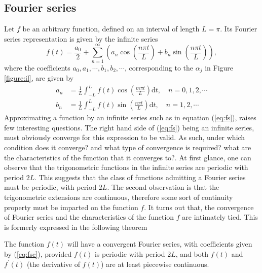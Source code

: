 \documentclass[../Main/thesis.tex]{subfiles}
\begin{document}
\justify
\subsection{Fourier series}
\label{sec:fouurier-serie}
 Let $f$ be an arbitrary function, defined on an interval of length $L = \pi$. Its Fourier series representation is given by the infinite series
\begin{equation}\label{eq:fs}
f(t) = \frac{a_{0}}{2} +\sum_{n=1}^{\infty}\left( a_{n} \cos\left( \frac{n\pi t}{L}\right) + b_{n} \sin\left( \frac{n\pi t}{L}\right)  \right),
 \end{equation}
where the coefficients $a_{0}, a_{1}, \cdots, b_{1}, b_{2},\cdots$, corresponding to the $\alpha_{j}$ in Figure \ref{figure:il}, are given by 
\begin{equation}\label{eq:fsc}
\begin{split}
a_{n} &= \frac{1}{L}\int_{-L}^{L}f(t)\cos\left( \frac{m\pi t}{L}\right) \mathrm{d}t,\quad n=0,1,2,\cdots\\
b_{n} &= \frac{1}{L}\int_{-L}^{L}f(t)\sin\left( \frac{n\pi t}{L}\right) \mathrm{d}t,\quad n=1,2,\cdots
\end{split}
\end{equation}
 Approximating a function by an infinite series such as in equation (\ref{eq:fs}), raises few interesting questions. The right hand side of (\ref{eq:fs}) being an infinite series, must obviously converge for this expression to be valid. As such, under which condition does it converge? and what type of convergence is required? what are the characteristics of the function that it converges to?.
\justify
At first glance, one can observe that the trigonometric functions in the infinite series are periodic with period $2L$. This suggests that the class of functions admitting a Fourier series must be periodic, with period $2L$. The second observation is that the trigonometric extensions are continuous, therefore some sort of continuity property must be imparted on the function $f$. It turns out that, the convergence of Fourier series and the characteristics of the function $f$ are intimately tied. This is formerly expressed in the following theorem
\begin{theorem}\label{thm:conv}
	The function $f(t)$ will  have a convergent Fourier series, with coefficients given by (\ref{eq:fsc}), provided $f(t)$ is periodic with period $2L$, and both $f(t)$ and $f^{\prime}(t)$ (the derivative of $f(t)$) are at least piecewise continuous.
\end{theorem}
\justify
\end{document}
